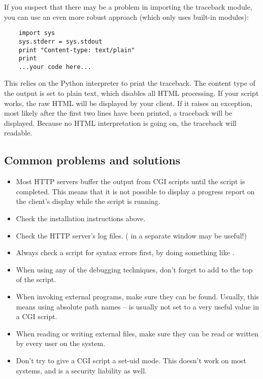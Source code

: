 If you suspect that there may be a problem in importing the traceback
module, you can use an even more robust approach (which only uses
built-in modules):

\begin{verbatim}
	import sys
	sys.stderr = sys.stdout
	print "Content-type: text/plain"
	print
	...your code here...
\end{verbatim}

This relies on the Python interpreter to print the traceback.  The
content type of the output is set to plain text, which disables all
HTML processing.  If your script works, the raw HTML will be displayed
by your client.  If it raises an exception, most likely after the
first two lines have been printed, a traceback will be displayed.
Because no HTML interpretation is going on, the traceback will
readable.


\subsection{Common problems and solutions}

\begin{itemize}
\item Most HTTP servers buffer the output from CGI scripts until the
script is completed.  This means that it is not possible to display a
progress report on the client's display while the script is running.

\item Check the installation instructions above.

\item Check the HTTP server's log files.  ( in a separate
window may be useful!)

\item Always check a script for syntax errors first, by doing something
like .

\item When using any of the debugging techniques, don't forget to add
 to the top of the script.

\item When invoking external programs, make sure they can be found.
Usually, this means using absolute path names --  is usually not
set to a very useful value in a CGI script.

\item When reading or writing external files, make sure they can be read
or written by every user on the system.

\item Don't try to give a CGI script a set-uid mode.  This doesn't work on
most systems, and is a security liability as well.
\end{itemize}

